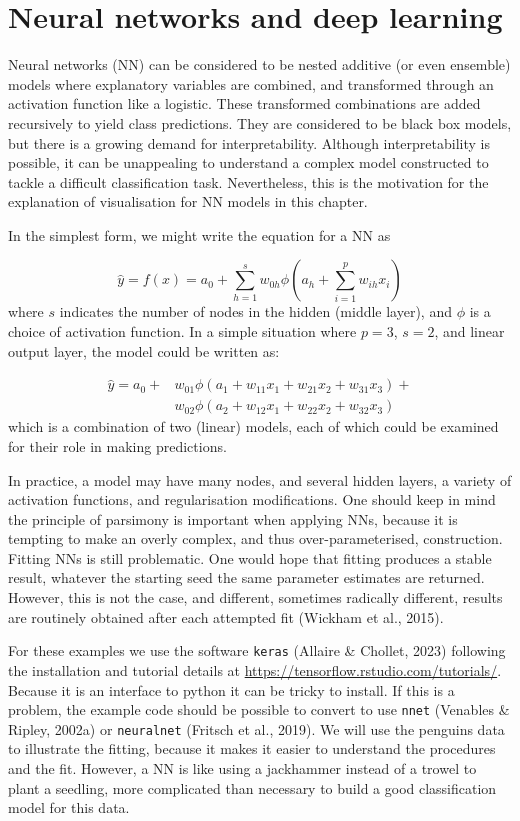 \documentclass[
  letterpaper,
]{krantz}
\begin{document}
\chapter{Neural networks and deep
learning}\label{neural-networks-and-deep-learning}


Neural networks (NN) can be considered to be nested additive (or even
ensemble) models where explanatory variables are combined, and
transformed through an activation function like a logistic. These
transformed combinations are added recursively to yield class
predictions. They are considered to be black box models, but there is a
growing demand for interpretability. Although interpretability is
possible, it can be unappealing to understand a complex model
constructed to tackle a difficult classification task. Nevertheless,
this is the motivation for the explanation of visualisation for NN
models in this chapter.

In the simplest form, we might write the equation for a NN as

\[
\hat{y} = f(x) = a_0+\sum_{h=1}^{s}
w_{0h}\phi(a_h+\sum_{i=1}^{p} w_{ih}x_i)
\] where \(s\) indicates the number of nodes in the hidden (middle
layer), and \(\phi\) is a choice of activation function. In a simple
situation where \(p=3\), \(s=2\), and linear output layer, the model
could be written as:

\[
\begin{aligned}
\hat{y} = a_0+ & w_{01}\phi(a_1+w_{11}x_1+w_{21}x_2+w_{31}x_3) +\\
 & w_{02}\phi(a_2+w_{12}x_1+w_{22}x_2+w_{32}x_3)
\end{aligned}
\] which is a combination of two (linear) models, each of which could be
examined for their role in making predictions.

In practice, a model may have many nodes, and several hidden layers, a
variety of activation functions, and regularisation modifications. One
should keep in mind the principle of parsimony is important when
applying NNs, because it is tempting to make an overly complex, and thus
over-parameterised, construction. Fitting NNs is still problematic. One
would hope that fitting produces a stable result, whatever the starting
seed the same parameter estimates are returned. However, this is not the
case, and different, sometimes radically different, results are
routinely obtained after each attempted fit (Wickham et al., 2015).

For these examples we use the software \texttt{keras} (Allaire \&
Chollet, 2023) following the installation and tutorial details at
\url{https://tensorflow.rstudio.com/tutorials/}. Because it is an
interface to python it can be tricky to install. If this is a problem,
the example code should be possible to convert to use \texttt{nnet}
(Venables \& Ripley, 2002a) or \texttt{neuralnet} (Fritsch et al.,
2019). We will use the penguins data to illustrate the fitting, because
it makes it easier to understand the procedures and the fit. However, a
NN is like using a jackhammer instead of a trowel to plant a seedling,
more complicated than necessary to build a good classification model for
this data.
\end{document}
